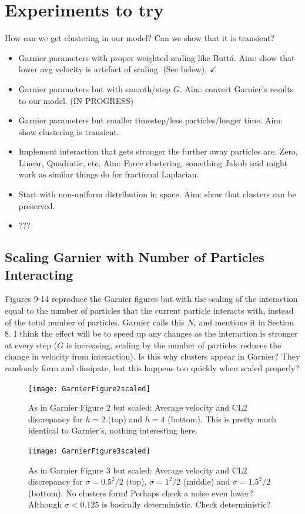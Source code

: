 \documentclass[11pt,a4paper, final, dvipsnames]{article}
\begin{document}
\section{Experiments to try}
    How can we get clustering in our model? Can we show that it is transient?
\begin{itemize}
    \item Garnier parameters with proper weighted scaling like Butt\'a. Aim: show that lower avg velocity is artefact of scaling. (See below). $\checkmark$
    \item Garnier parameters but with smooth/step $G$. Aim: convert Garnier's results to our model.  (IN PROGRESS)
    \item Garnier parameters but smaller timestep/less particles/longer time. Aim: show clustering is transient.
    \item Implement interaction that gets stronger the further away particles are. Zero, Linear, Quadratic, etc. Aim: Force clustering, something Jakub said might work as similar things do for fractional Laplacian.
    \item Start with non-uniform distribution in space. Aim: show that clusters can be preserved.
    \item ???
\end{itemize}

\subsection{Scaling Garnier with Number of Particles Interacting }
Figures 9-14 reproduce the Garnier figures but with the scaling of the interaction equal to the number of particles that the current particle interacts with, instead of the total number of particles. Garnier calls this $N_i$ and mentions it in Section 8. I think the effect will be to speed up any changes as the interaction is stronger at every step ($G$ is increasing, scaling by the number of particles reduces the change in velocity from interaction). Is this why clusters appear in Garnier? They randomly form and dissipate, but this happens too quickly when scaled properly?
\begin{figure}
    \centering
        \texttt{[image: GarnierFigure2scaled]}
    \caption{As in Garnier Figure 2 but scaled: Average velocity and CL2 discrepancy for $ h=2$ (top) and $h=4$ (bottom). This is pretty much identical to Garnier's, nothing interesting here. }
\end{figure}
\begin{figure}
    \centering
    \texttt{[image: GarnierFigure3scaled]}
    \caption{As in Garnier Figure 3 but scaled: Average velocity and CL2 discrepancy for $\sigma = 0.5^2/2$ (top), $\sigma = 1^2/2$ (middle) and $\sigma = 1.5^2/2$ (bottom). No clusters form! Perhaps check a noise even lower? Although $\sigma < 0.125$ is basically deterministic. Check deterministic?}
\end{figure}
\end{document}
